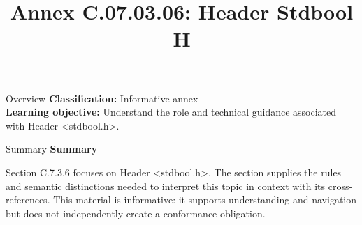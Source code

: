 \documentclass[10pt,letterpaper]{article}
\title{Annex C.07.03.06: Header Stdbool H}
\author{}
\date{}
\begin{document}
\maketitle
\begin{CornellOverviewBox}{Overview}
\textbf{Classification:} Informative annex\\[2pt]
\textbf{Learning objective:} Understand the role and technical guidance associated with Header <stdbool.h>.
\end{CornellOverviewBox}\begin{CornellSummaryBox}{Summary}
{\sffamily\bfseries\color{Accent} Summary}\par\vspace{3pt}Section C.7.3.6 focuses on Header <stdbool.h>. The section supplies the rules and semantic distinctions needed to interpret this topic in context with its cross-references. This material is informative: it supports understanding and navigation but does not independently create a conformance obligation.
\end{CornellSummaryBox}
\end{document}
